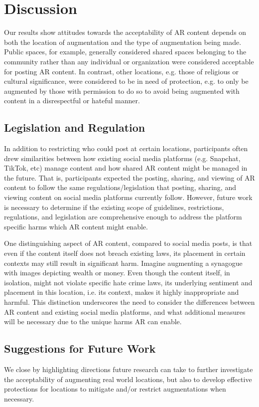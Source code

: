 \section{Discussion}
Our results show attitudes towards the acceptability of AR content depends on both the location of augmentation and the type of augmentation being made. 
Public spaces, for example, generally considered shared spaces belonging to the community rather than any individual or organization \cite{disc_1, disc_2} were considered acceptable for posting AR content. 
In contrast, other locations, e.g. those of religious or cultural significance, were considered to be in need of protection, e.g. to only be augmented by those with permission to do so to avoid being augmented with content in a disrespectful or hateful manner.


\subsection{Legislation and Regulation}
In addition to restricting who could post at certain locations, participants often drew similarities between how existing social media platforms (e.g. Snapchat, TikTok, etc) manage content and how shared AR content might be managed in the future. 
That is, participants expected the posting, sharing, and viewing of AR content to follow the same regulations/legislation that posting, sharing, and viewing content on social media platforms currently follow. 
However, future work is necessary to determine if the existing scope of guidelines, restrictions, regulations, and legislation are comprehensive enough to address the platform specific harms which AR content might enable. 

One distinguishing aspect of AR content, compared to social media posts, is that even if the content itself does not breach existing laws, its placement in certain contexts may still result in significant harm. 
Imagine augmenting a synagogue with images depicting wealth or money. 
Even though the content itself, in isolation, might not violate specific hate crime laws, its underlying sentiment and placement in this location, i.e. its context, makes it highly inappropriate and harmful. 
This distinction underscores the need to consider the differences between AR content and existing social media platforms, and what additional measures will be necessary due to the unique harms AR can enable. 





\subsection{Suggestions for Future Work}
We close by highlighting directions future research can take to further investigate the acceptability of augmenting real world locations, but also to develop effective protections for locations to mitigate and/or restrict augmentations when necessary.  

